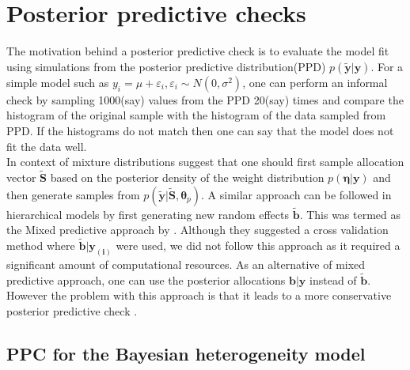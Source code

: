 \section{Posterior predictive checks}
\label{sec : ppc}
The motivation behind a posterior predictive check is to evaluate the model fit using simulations from the posterior predictive distribution(PPD) $p(\boldsymbol{\tilde{y}}|\boldsymbol{y})$. For a simple model such as $y_i = \mu + \varepsilon_i, \varepsilon_i \sim N(0, \sigma^2)$, one can perform an informal check by sampling 1000(say) values from the PPD 20(say) times and compare the histogram of the original sample with the histogram of the data sampled from PPD. If the histograms do not match then one can say that the model does not fit the data well.\\

In context of mixture distributions \citet{fruhwirth-schnatter_finite_2013} suggest that one should first sample allocation vector $\boldsymbol{\tilde{S}}$ based on the posterior density of the weight distribution $p(\boldsymbol{\eta}|\boldsymbol{y})$ and then generate samples from $p(\boldsymbol{\tilde{y}}|\boldsymbol{\tilde{S}}, \boldsymbol{\theta}_p)$. A similar approach can be followed in hierarchical models by first generating new random effects $\boldsymbol{\tilde{b}}$. This was termed as the Mixed predictive approach by \citet{marshall_approximate_2003}. Although they suggested a cross validation method where $\boldsymbol{\tilde{b}}|\boldsymbol{y_{(i)}}$ were used, we did not follow this approach as it required a significant amount of computational resources. As an alternative of mixed predictive approach, one can use the posterior allocations $\boldsymbol{b}|\boldsymbol{y}$ instead of $\boldsymbol{\tilde{b}}$. However the problem with this approach is that it leads to a more conservative posterior predictive check \citep{congdon_applied_2010}.\\

\subsection{PPC for the Bayesian heterogeneity model}
\label{subsec : ppc_bhtge}
